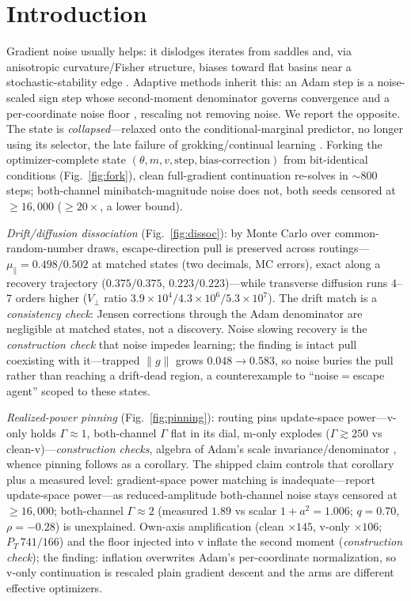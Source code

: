\section{Introduction}
\label{sec:intro}

Gradient noise usually helps: it dislodges iterates from saddles \citep{saddle} and, via anisotropic curvature/Fisher structure, biases toward flat basins \citep{zhu,wumae,wenfisher,ziyin} near a stochastic-stability edge \citep{eoss}. Adaptive methods inherit this: an Adam step is a noise-scaled sign step \citep{adam,balleshennig,kunstner} whose second-moment denominator governs convergence \citep{amsgrad} and a per-coordinate noise floor \citep{dpadambc,litramer}, rescaling not removing noise. We report the opposite. The state is \emph{collapsed}---relaxed onto the conditional-marginal predictor, no longer using its selector, the late failure of grokking/continual learning \citep{antigrok,dohare,stochcollapse}. Forking the optimizer-complete state $(\theta,m,v,\text{step},\text{bias-correction})$ from bit-identical conditions (Fig.~\ref{fig:fork}), clean full-gradient continuation re-solves in ${\sim}800$ steps; both-channel minibatch-magnitude noise does not, both seeds censored at $\ge16{,}000$ ($\ge20\times$, a lower bound).

\emph{Drift/diffusion dissociation} (Fig.~\ref{fig:dissoc}): by Monte Carlo over common-random-number draws, escape-direction pull is preserved across routings---$\mu_\parallel=0.498/0.502$ at matched states (two decimals, MC errors), exact along a recovery trajectory ($0.375/0.375$, $0.223/0.223$)---while transverse diffusion runs $4$--$7$ orders higher ($V_\perp$ ratio $3.9{\times}10^4/4.3{\times}10^6/5.3{\times}10^7$). The drift match is a \emph{consistency check}: Jensen corrections through the Adam denominator are negligible at matched states, not a discovery. Noise slowing recovery is the \emph{construction check} that noise impedes learning; the finding is intact pull coexisting with it---trapped $\|g\|$ grows $0.048{\to}0.583$, so noise buries the pull rather than reaching a drift-dead region, a counterexample to ``noise$=$escape agent'' scoped to these states.

\emph{Realized-power pinning} (Fig.~\ref{fig:pinning}): routing pins update-space power---v-only holds $\Gamma\approx1$, both-channel $\Gamma$ flat in its dial, m-only explodes ($\Gamma\gtrsim250$ vs clean-v)---\emph{construction checks}, algebra of Adam's scale invariance/denominator \citep{adam}, whence pinning follows as a corollary. The shipped claim controls that corollary plus a measured level: gradient-space power matching is inadequate---report update-space power---as reduced-amplitude both-channel noise stays censored at $\ge16{,}000$; both-channel $\Gamma\approx2$ (measured $1.89$ vs scalar $1{+}a^2=1.006$; $q=0.70$, $\rho=-0.28$) is unexplained. Own-axis amplification (clean $\times145$, v-only $\times106$; $P_T\,741/166$) and the floor injected into v inflate the second moment (\emph{construction check}); the finding: inflation overwrites Adam's per-coordinate normalization, so v-only continuation is rescaled plain gradient descent and the arms are different effective optimizers.

